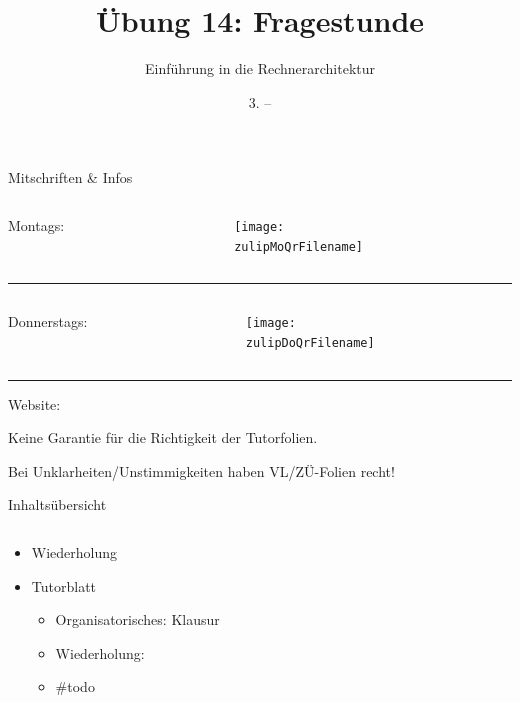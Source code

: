 \documentclass[
  german,            %
  aspectratio=169,    %
]{tumbeamer}
\title{Übung 14: Fragestunde}
\subtitle{Einführung in die Rechnerarchitektur}
\author{\theAuthorName}
\institute{\theGroupName\\\theSchoolName\\\theUniversityName}
\date{3. -- \DTMdisplaydate{2025}{02}{9}{-1}}
\begin{document}
\maketitle

\begin{frame}[c]{Mitschriften \& Infos}{}
  \begin{minipage}[t]{\textwidth}
    \begin{columns}[c]
      \begin{column}{0.8\textwidth}
        Montags: \href{\zulipMo}{\zulipMo}
      \end{column}
      \begin{column}{0.2\textwidth}
        \texttt{[image: \\zulipMoQrFilename]}
      \end{column}
    \end{columns}
  \end{minipage}
  \rule{\textwidth}{0.4pt}
  \begin{minipage}[t]{\textwidth}
    \begin{columns}[c]
      \begin{column}{0.8\textwidth}
        Donnerstags: \href{\zulipDo}{\zulipDo}
      \end{column}
      \begin{column}{0.2\textwidth}
        \texttt{[image: \\zulipDoQrFilename]}
      \end{column}
    \end{columns}
  \end{minipage}
  \ifdefined\myWebsite
  \rule{\textwidth}{0.4pt}
  \centering
  Website: \href{\myWebsite}{\myWebsite}
  \fi
\end{frame}

\begin{frame}[c]{}{}
  \begin{center}
    \LARGE  Keine Garantie für die Richtigkeit der Tutorfolien.

    \Large Bei Unklarheiten/Unstimmigkeiten haben VL/ZÜ-Folien recht!
  \end{center}
\end{frame}

\begin{frame}[c]{Inhaltsübersicht}{}
  \begin{columns}[c]
    \begin{column}{1\textwidth}
      \begin{itemize}
        \item Wiederholung
        \item Tutorblatt
        \begin{itemize}
			\item Organisatorisches: Klausur
			\item Wiederholung: 
			\item \#todo
        \end{itemize}
      \end{itemize}
    \end{column}
  \end{columns}
\end{frame}
\end{document}

